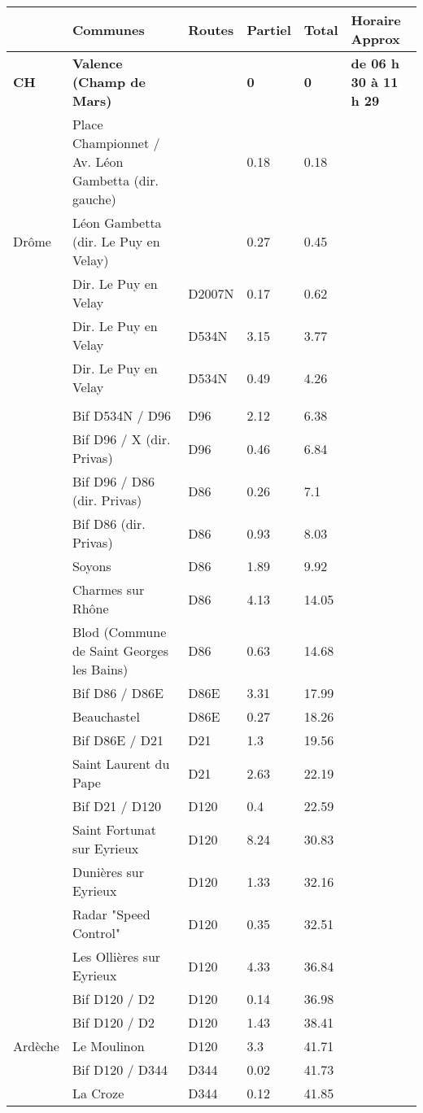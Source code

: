 \documentclass{article}%
\begin{document}
\begin{longtable}{p{2.25cm}|p{7.0cm}|p{1.5cm}|p{1.5cm}|p{1.5cm}|p{3.5cm}}%
\hline%
&Communes&Routes&Partiel&Total&Horaire Approx\\%
\hline%
\endhead%
\endfoot%
\endlastfoot%
\textbf{﻿CH}&\textbf{Valence (Champ de Mars)}& &\textbf{0}&\textbf{0}&\textbf{de 06 h 30 à 11 h 29}\\%
 &Place Championnet / Av. Léon Gambetta (dir. gauche)& &0.18&0.18& \\%
Drôme&Léon Gambetta (dir. Le Puy en Velay)& &0.27&0.45& \\%
 &Dir. Le Puy en Velay&D2007N&0.17&0.62& \\%
 &Dir. Le Puy en Velay&D534N&3.15&3.77& \\%
 &Dir. Le Puy en Velay&D534N&0.49&4.26& \\%
 & & & & & \\%
 &Bif D534N / D96&D96&2.12&6.38& \\%
 &Bif D96 / X (dir. Privas)&D96&0.46&6.84& \\%
 &Bif D96 / D86 (dir. Privas)&D86&0.26&7.1& \\%
 &Bif D86 (dir. Privas)&D86&0.93&8.03& \\%
 &Soyons&D86&1.89&9.92& \\%
 &Charmes sur Rhône&D86&4.13&14.05& \\%
 &Blod (Commune de Saint Georges les Bains)&D86&0.63&14.68& \\%
 &Bif D86 / D86E&D86E&3.31&17.99& \\%
 &Beauchastel&D86E&0.27&18.26& \\%
 &Bif D86E / D21&D21&1.3&19.56& \\%
 &Saint Laurent du Pape&D21&2.63&22.19& \\%
 &Bif D21 / D120&D120&0.4&22.59& \\%
 &Saint Fortunat sur Eyrieux&D120&8.24&30.83& \\%
 &Dunières sur Eyrieux&D120&1.33&32.16& \\%
 &Radar "Speed Control"&D120&0.35&32.51& \\%
 &Les Ollières sur Eyrieux&D120&4.33&36.84& \\%
 &Bif D120 / D2&D120&0.14&36.98& \\%
 &Bif D120 / D2&D120&1.43&38.41& \\%
Ardèche&Le Moulinon&D120&3.3&41.71& \\%
 &Bif D120 / D344&D344 &0.02&41.73& \\%
 &La Croze&D344 &0.12&41.85& \\%

\end{longtable}
\end{document}

